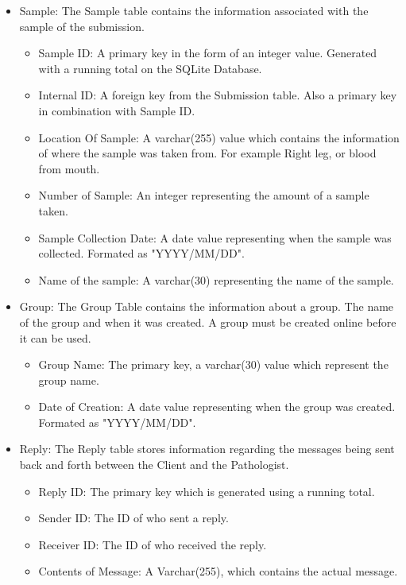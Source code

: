 \documentclass[onecolumn, draftclsnofoot,10pt, compsoc]{IEEEtran}
\begin{document}
\begin{itemize}
\item Sample:\newline
The Sample table contains the information associated with the sample of the submission. 
\begin{itemize}
\item Sample ID: A primary key in the form of an integer value. Generated with a running total on the SQLite Database.
\item Internal ID: A foreign key from the Submission table. Also a primary key in combination with Sample ID.
\item Location Of Sample: A varchar(255) value which contains the information of where the sample was taken from. For example Right leg, or blood from mouth.
\item Number of Sample: An integer representing the amount of a sample taken.
\item Sample Collection Date: A date value representing when the sample was collected. Formated as "YYYY/MM/DD".
\item Name of the sample: A varchar(30) representing the name of the sample.
\end{itemize}

\item Group:\newline
The Group Table contains the information about a group. The name of the group and when it was created. A group must be created online before it can be used.
\begin{itemize}
\item Group Name: The primary key, a varchar(30) value which represent the group name. 
\item Date of Creation: A date value representing when the group was created. Formated as "YYYY/MM/DD".
\end{itemize}

\item Reply:\newline
The Reply table stores information regarding the messages being sent back and forth between the Client and the Pathologist.
\begin{itemize}
\item Reply ID: The primary key which is generated using a running total.
\item Sender ID: The ID of who sent a reply.
\item Receiver ID: The ID of who received the reply.
\item Contents of Message: A Varchar(255), which contains the actual message.
\end{itemize}


\end{itemize}
\end{document}
